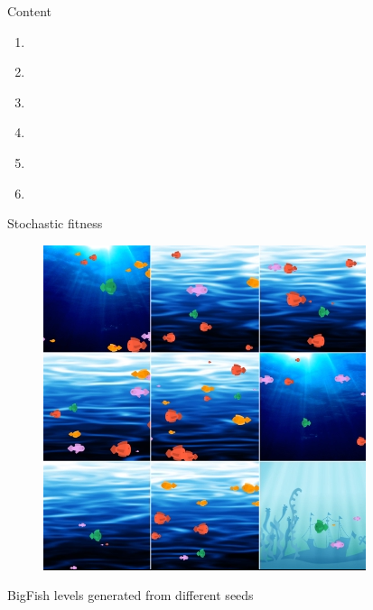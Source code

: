 \begin{frame}{Content}
    \begin{enumerate}%
      \setlength\itemsep{1em}%
      \item {\color{lightgray} \ti{}} \tei{}
      \item {\color{lightgray} \tii{}} \teii{}
      \item {\color{lightgray} \tiii{}} \teiii{}
      \item {\color{lightgray} \tiv{}} \teiv{}
      \item {\color{lightgray} \tcv{}} \tev{}
      \item {\color{lightgray} \tvi{}} \tevi{}
    \end{enumerate}
  \end{frame}

\begin{frame}{\tcv{} Stochastic fitness}
    
    \begin{figure}
    \centering
    \includegraphics[width=.4\linewidth]{images/misc/bigfish.png}
    \end{figure}
    \begin{center}
        \small BigFish levels generated from different seeds
    \end{center}
\end{frame}

